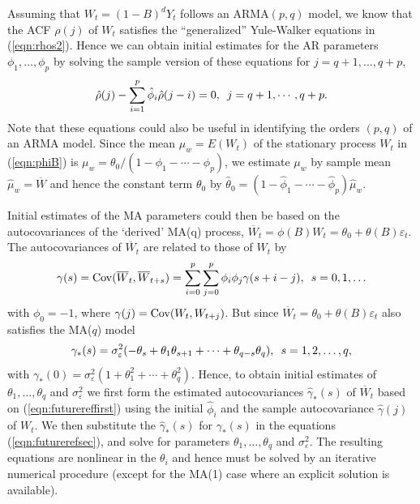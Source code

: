 Assuming that $W_t=(1 - B)^dY_t$ follows an ARMA$(p,q)$ model, we know that the ACF $\rho(j)$ of $W_t$ satisfies the ``generalized'' Yule-Walker equations in (\ref{eqn:rhos2}). Hence we can obtain initial estimates for the AR parameters $\phi_1,\ldots,\phi_p$ by solving the sample version of these equations for $j=q+1,\ldots,q+p$,
	\begin{equation}\label{eqn:rhohatsum}
	\hat{\rho}(j) - \sum_{i=1}^p \hat{\phi}_i \hat{\rho}(j-i) = 0, \enskip j=q+1,\cdots,q+p.
	\end{equation}
Note that these equations could also be useful in identifying the orders $(p,q)$ of an ARMA model. Since the mean $\mu_w = E(W_t)$ of the stationary process $W_t$ in (\ref{eqn:phiB}) is $\mu_w = \theta_0/(1-\phi_1-\cdots-\phi_p)$, we estimate $\mu_w$ by sample mean $\hat{\mu}_w = \overline{W}$ and hence the constant term $\theta_0$ by $\hat{\theta}_0 = (1-\hat{\phi}_1-\cdots-\hat{\phi}_p)\hat{\mu}_w$.


Initial estimates of the MA parameters could then be based on the autocovariances of the `derived' MA(q) process, $\overline{W}_t = \phi(B)W_t = \theta_0 + \theta(B)\varepsilon_t$. The autocovariances of $\overline{W}_t$ are related to those of $W_t$ by
	\begin{equation}\label{eqn:gamseq}
	\gamma(s) = \Cov(\overline{W}_t, \overline{W}_{t+s}) = \sum_{i=0}^p \sum_{j=0}^p \phi_i\phi_j\gamma(s+i-j),\enskip s = 0,1,\ldots
	\end{equation}
with $\phi_0 = -1$, where $\gamma(j) = \operatorname{Cov}(W_t, W_{t+j})$. But since $\overline{W}_t = \theta_0 + \theta(B)\varepsilon_t$ also satisfies the MA($q$) model
	\begin{equation}\label{eqn:gamstareq}
	\gamma_*(s) = \sigma_{\varepsilon}^2(-\theta_s + \theta_1\theta_{s+1} + \cdots + \theta_{q-s}\theta_q),\enskip s = 1,2,\ldots,q,
	\end{equation}
with $\gamma_*(0) = \sigma_{\varepsilon}^2(1 + \theta_1^2 + \cdots + \theta_q^2)$. Hence, to obtain initial estimates of $\theta_1,\ldots,\theta_q$ and $\sigma_{\varepsilon}^2$ we first form the estimated autocovariances $\hat{\gamma}_*(s)$ of $\overline{W}_t$ based on (\ref{eqn:futurereffirst}) using the initial $\hat{\phi}_{i}$ and the sample autocovariance $\hat{\gamma}(j)$ of $W_t$. We then substitute the $\hat{\gamma}_*(s)$ for $\gamma_*(s)$ in the equations (\ref{eqn:futurerefsec}), and solve for parameters $\theta_1,\ldots,\theta_q$ and $\sigma_{\varepsilon}^2$. The resulting equations are nonlinear in the $\theta_i$ and hence must be solved by an iterative numerical procedure (except for the MA(1) case where an explicit solution is available).


